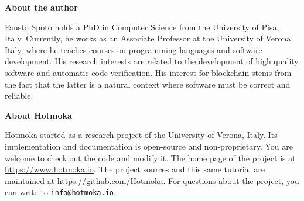 \newpage

\pagestyle{empty}

\nbvspace[1]
\normalsize

\textbf{About the author}

Fausto Spoto holds a PhD in Computer Science from the University of Pisa, Italy.
Currently, he works as an Associate Professor at the University of Verona, Italy, where
he teaches courses on programming languages and software development.
His research interests are related to the development of high quality software
and automatic code verification. His interest for blockchain stems
from the fact that the latter is a natural context where
software must be correct and reliable.

\nbvspace[1]

\textbf{About Hotmoka}

Hotmoka started as a research project of the University of Verona, Italy.
Its implementation and documentation is open-source and
non-proprietary. You are welcome to check out the code and modify it.
The home page of the project is at \url{https://www.hotmoka.io}.
The project sources and this same tutorial
are maintained at \url{https://github.com/Hotmoka}.
For questions about the project, you can write to \texttt{info@hotmoka.io}.
